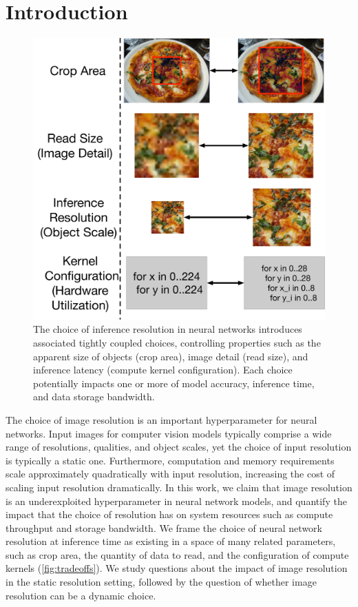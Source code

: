 \section{Introduction}
\begin{figure}
    \centering
    \includegraphics[width=\textwidth]{e2e_diagrams/tradeoff space.pdf}
    \caption{The choice of inference resolution in neural networks introduces associated tightly coupled choices, controlling properties such as the apparent size of objects (crop area), image detail (read size), and inference latency (compute kernel configuration). Each choice potentially impacts one or more of model accuracy, inference time, and data storage bandwidth.}
    \label{fig:tradeoffs}
\end{figure}

The choice of image resolution is an important hyperparameter for neural networks.
Input images for computer vision models typically comprise a wide range of resolutions, qualities, and object scales, yet the choice of input resolution is typically a static one.
Furthermore, computation and memory requirements scale approximately quadratically with input resolution, increasing the cost of scaling input resolution dramatically.
In this work, we claim that image resolution is an underexploited hyperparameter in neural network models, and quantify the impact that the choice of resolution has on system resources such as compute throughput and storage bandwidth.
We frame the choice of neural network resolution at inference time as existing in a space of many related parameters, such as crop area, the quantity of data to read, and the configuration of compute kernels (\autoref{fig:tradeoffs}).
We study questions about the impact of image resolution in the static resolution setting, followed by the question of whether image resolution can be a dynamic choice.
 
